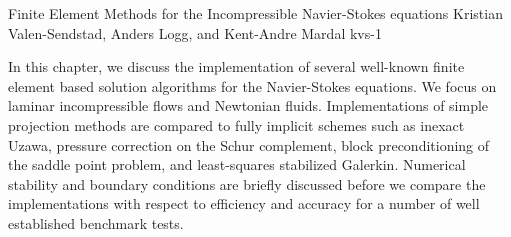               {Finite Element Methods for the Incompressible Navier-Stokes equations}
              {Kristian Valen-Sendstad, Anders Logg, and Kent-Andre Mardal}
              {kvs-1}

In this chapter, we discuss the implementation of several well-known
finite element based solution algorithms for the Navier-Stokes
equations. We focus on laminar incompressible flows and Newtonian
fluids. Implementations of simple projection methods are compared to
fully implicit schemes such as inexact Uzawa, pressure correction on
the Schur complement, block preconditioning of the saddle point
problem, and least-squares stabilized Galerkin. Numerical stability
and boundary conditions are briefly discussed before we compare the
implementations with respect to efficiency and accuracy for a number
of well established benchmark tests.
